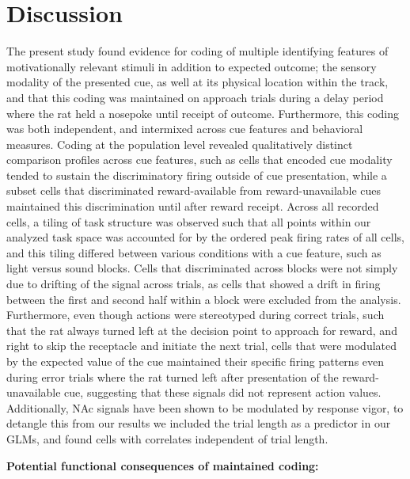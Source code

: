 \documentclass[11pt]{article}
\begin{document}
\section*{Discussion}

The present study found evidence for coding of multiple identifying features of motivationally relevant stimuli in addition to expected outcome; the sensory modality of the presented cue, as well at its physical location within the track, and that this coding was maintained on approach trials during a delay period where the rat held a nosepoke until receipt of outcome. Furthermore, this coding was both independent, and intermixed across cue features and behavioral measures. Coding at the population level revealed qualitatively distinct comparison profiles across cue features, such as cells that encoded cue modality tended to sustain the discriminatory firing outside of cue presentation, while a subset cells that discriminated reward-available from reward-unavailable cues maintained this discrimination until after reward receipt. Across all recorded cells, a tiling of task structure was observed such that all points within our analyzed task space was accounted for by the ordered peak firing rates of all cells, and this tiling differed between various conditions with a cue feature, such as light versus sound blocks. Cells that discriminated across blocks were not simply due to drifting of the signal across trials, as cells that showed a drift in firing between the first and second half within a block were excluded from the analysis. Furthermore, even though actions were stereotyped during correct trials, such that the rat always turned left at the decision point to approach for reward, and right to skip the receptacle and initiate the next trial, cells that were modulated by the expected value of the cue maintained their specific firing patterns even during error trials where the rat turned left after presentation of the reward-unavailable cue, suggesting that these signals did not represent action values. Additionally, NAc signals have been shown to be modulated by response vigor, to detangle this from our results we included the trial length as a predictor in our GLMs, and found cells with correlates independent of trial length.

{\bf Potential functional consequences of maintained coding:}
\end{document}
